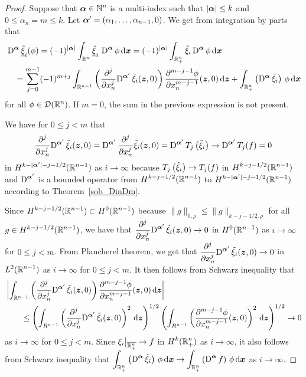 \begin{proof}
Suppose that $\DS \VEC{\alpha} \in \NN^n$ is a multi-index such
that $|\VEC{\alpha}| \leq k$ and $0 \leq \alpha_n = m \leq k$.  Let
$\VEC{\alpha}' = (\alpha_1, \ldots, \alpha_{n-1},0)$.  We get from
integration by parts that
\begin{align}
&\diff^{\VEC{\alpha}} \underline{\tilde{\xi}}_i(\phi)
= (-1)^{|\VEC{\alpha}|} \int_{\RR^n}
\underline{\tilde{\xi}}_i\, \diff^{\VEC{\alpha}} \phi \dx{\VEC{x}}
= (-1)^{|\VEC{\alpha}|} \int_{\RR^n_+} \tilde{\xi}_i
\diff^{\VEC{\alpha}} \phi \dx{\VEC{x}}
\nonumber \\
&\quad = \sum_{j=0}^{m-1} (-1)^{m+j} \int_{\RR^{n-1}}
\left( \pdfdxn{\diff^{\VEC{\alpha}'} \tilde{\xi}_i}{x_n}{j}(\VEC{z},0) \right)
\pdydxn{\phi}{x_n}{m-j-1}(\VEC{z},0) 
\dx{\VEC{z}} + \int_{\RR^n_+} \left(\diff^{\VEC{\alpha}} \tilde{\xi}_i\right)\,
\phi \dx{\VEC{x}}   \label{H0TraceEq1}
\end{align}
for all $\DS \phi \in \DD(\RR^n)$.  If $m=0$, the sum in the previous
expression is not present.

We have for $0 \leq j <m$ that
\[
\pdfdxn{\diff^{\VEC{\alpha}'} \tilde{\xi}_i}{x_n}{j}(\VEC{z},0)
= \diff^{\VEC{\alpha}'} \pdfdxn{\tilde{\xi}_i}{x_n}{j}(\VEC{z},0)
= \diff^{\VEC{\alpha}'}  T_j\left( \tilde{\xi}_i \right) \to 
\diff^{\VEC{\alpha}'}  T_j(f) = 0
\]
in $\DS H^{k-|\VEC{\alpha}'|-j -1/2}(\RR^{n-1})$ as $i \to \infty$
because
$\DS T_j\left( \tilde{\xi}_i \right) \to  T_j(f)$ in
$\DS H^{k-j -1/2}(\RR^{n-1})$ and
$\DS \diff^{\VEC{\alpha}'}$ is a bounded operator from
$\DS H^{k-j -1/2}(\RR^{n-1})$ to
$\DS H^{k-|\VEC{\alpha}'|-j -1/2}(\RR^{n-1})$ according to 
Theorem~\ref{sob_DinDm}.

Since $\DS H^{k-j -1/2}(\RR^{n-1}) \subset H^0(\RR^{n-1})$
because $\|g\|_{0,\rho} \leq \|g\|_{k-j -1/2,\rho}$ for all\\
$\DS g \in H^{k-j -1/2}(\RR^{n-1})$, we have that
$\DS \pdfdxn{\diff^{\VEC{\alpha}'}
\tilde{\xi}_i}{x_n}{j}(\VEC{z},0) \to 0$
in $\DS H^0(\RR^{n-1})$ as $i \to \infty$ for $0 \leq j <m$.
From Plancherel theorem, we get that
$\DS \pdfdxn{\diff^{\VEC{\alpha}'}
\tilde{\xi}_i}{x_n}{j}(\VEC{z},0) \to 0$
in $\DS L^2(\RR^{n-1})$ as $i \to \infty$ for $0 \leq j <m$.
It then follows from Schwarz inequality that
\begin{align*}
&\left| \int_{\RR^{n-1}}
\left( \pdfdxn{\diff^{\VEC{\alpha}'} \tilde{\xi}_i}{x_n}{j}(\VEC{z},0) \right)
\pdydxn{\phi}{x_n}{m-j-1}(\VEC{z},0) 
\dx{\VEC{z}} \right| \\
& \qquad \leq
\left( \int_{R^{n-1}} \left(
\pdfdxn{\diff^{\VEC{\alpha}'} \tilde{\xi}_i}{x_n}{j}(\VEC{z},0) \right)^2
\dx{\VEC{z}} \right)^{1/2}
\left( \int_{R^{n-1}} \left( \pdydxn{\phi}{x_n}{m-j-1}(\VEC{z},0) \right)^2
\dx{\VEC{z}} \right)^{1/2} \to 0
\end{align*}
as $i \to \infty$ for $0 \leq j <m$.
Since $\DS \xi_i\big|_{\overline{\RR^n_+}} \to f$ in
$\DS H^k(\RR^n_+)$ as $i \to \infty$, it also follows from Schwarz
inequality that
$\DS \int_{\RR^n_+} \left(\diff^{\VEC{\alpha}}
\tilde{\xi}_i\right)\, \phi \dx{\VEC{x}}
\to \int_{\RR^n_+} \left(\diff^{\VEC{\alpha}} f\right) \, \phi \dx{\VEC{x}}$
as $i \to \infty$.


\end{proof}
